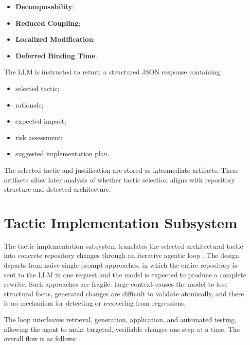 \begin{itemize}
    \item \textbf{Decomposability};
    \item \textbf{Reduced Coupling};
    \item \textbf{Localized Modification};
    \item \textbf{Deferred Binding Time}.
\end{itemize}

The LLM is instructed to return a structured JSON response containing:

\begin{itemize}
    \item selected tactic;
    \item rationale;
    \item expected impact;
    \item risk assessment;
    \item suggested implementation plan.
\end{itemize}

The selected tactic and justification are stored as intermediate artifacts. These artifacts allow later analysis of whether tactic selection aligns with repository structure and detected architecture.

\section{Tactic Implementation Subsystem}
\label{sec:impl_tactic_implementation}

The tactic implementation subsystem translates the selected architectural tactic into concrete repository changes through an iterative agentic loop \cite{yao2022react}. The design departs from naive single-prompt approaches, in which the entire repository is sent to the LLM in one request and the model is expected to produce a complete rewrite. Such approaches are fragile: large context causes the model to lose structural focus, generated changes are difficult to validate atomically, and there is no mechanism for detecting or recovering from regressions.

The loop interleaves retrieval, generation, application, and automated testing, allowing the agent to make targeted, verifiable changes one step at a time. The overall flow is as follows:

